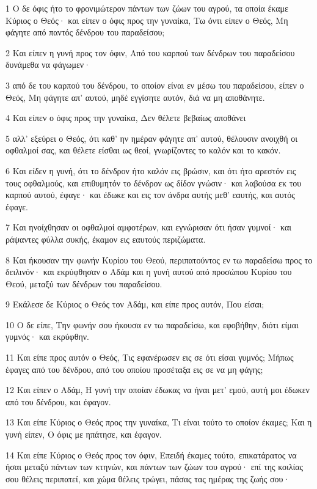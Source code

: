 \par 1 Ο δε όφις ήτο το φρονιμώτερον πάντων των ζώων του αγρού, τα οποία έκαμε Κύριος ο Θεός· και είπεν ο όφις προς την γυναίκα, Τω όντι είπεν ο Θεός, Μη φάγητε από παντός δένδρου του παραδείσου;
\par 2 Και είπεν η γυνή προς τον όφιν, Από του καρπού των δένδρων του παραδείσου δυνάμεθα να φάγωμεν·
\par 3 από δε του καρπού του δένδρου, το οποίον είναι εν μέσω του παραδείσου, είπεν ο Θεός, Μη φάγητε απ' αυτού, μηδέ εγγίσητε αυτόν, διά να μη αποθάνητε.
\par 4 Και είπεν ο όφις προς την γυναίκα, Δεν θέλετε βεβαίως αποθάνει
\par 5 αλλ' εξεύρει ο Θεός, ότι καθ' ην ημέραν φάγητε απ' αυτού, θέλουσιν ανοιχθή οι οφθαλμοί σας, και θέλετε είσθαι ως θεοί, γνωρίζοντες το καλόν και το κακόν.
\par 6 Και είδεν η γυνή, ότι το δένδρον ήτο καλόν εις βρώσιν, και ότι ήτο αρεστόν εις τους οφθαλμούς, και επιθυμητόν το δένδρον ως δίδον γνώσιν· και λαβούσα εκ του καρπού αυτού, έφαγε· και έδωκε και εις τον άνδρα αυτής μεθ' εαυτής, και αυτός έφαγε.
\par 7 Και ηνοίχθησαν οι οφθαλμοί αμφοτέρων, και εγνώρισαν ότι ήσαν γυμνοί· και ράψαντες φύλλα συκής, έκαμον εις εαυτούς περιζώματα.
\par 8 Και ήκουσαν την φωνήν Κυρίου του Θεού, περιπατούντος εν τω παραδείσω προς το δειλινόν· και εκρύφθησαν ο Αδάμ και η γυνή αυτού από προσώπου Κυρίου του Θεού, μεταξύ των δένδρων του παραδείσου.
\par 9 Εκάλεσε δε Κύριος ο Θεός τον Αδάμ, και είπε προς αυτόν, Που είσαι;
\par 10 Ο δε είπε, Την φωνήν σου ήκουσα εν τω παραδείσω, και εφοβήθην, διότι είμαι γυμνός· και εκρύφθην.
\par 11 Και είπε προς αυτόν ο Θεός, Τις εφανέρωσεν εις σε ότι είσαι γυμνός; Μήπως έφαγες από του δένδρου, από του οποίου προσέταξα εις σε να μη φάγης;
\par 12 Και είπεν ο Αδάμ, Η γυνή την οποίαν έδωκας να ήναι μετ' εμού, αυτή μοι έδωκεν από του δένδρου, και έφαγον.
\par 13 Και είπε Κύριος ο Θεός προς την γυναίκα, Τι είναι τούτο το οποίον έκαμες; Και η γυνή είπεν, Ο όφις με ηπάτησε, και έφαγον.
\par 14 Και είπε Κύριος ο Θεός προς τον όφιν, Επειδή έκαμες τούτο, επικατάρατος να ήσαι μεταξύ πάντων των κτηνών, και πάντων των ζώων του αγρού· επί της κοιλίας σου θέλεις περιπατεί, και χώμα θέλεις τρώγει, πάσας τας ημέρας της ζωής σου·
